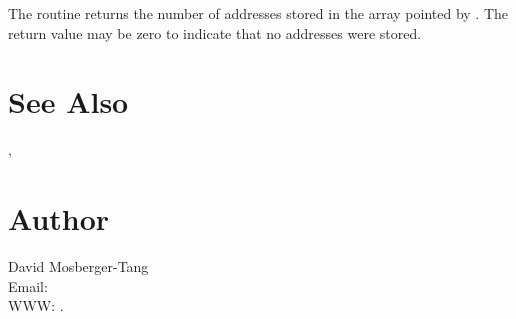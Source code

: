 \documentclass{article}
\begin{document}
The routine returns the number of addresses stored in the array pointed by
. The return value may be zero to indicate that no addresses were
stored.

\section{See Also}

,

\section{Author}

\noindent
David Mosberger-Tang\\
Email: \\
WWW: .
\LatexManEnd
\end{document}
